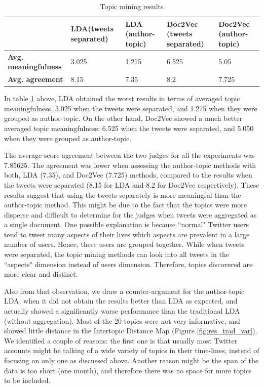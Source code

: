\documentclass[11pt]{article}
\begin{document}
\begin{table}[H]
	\centering
	\begin{tabular}{| l | p{2.5cm} | p{2.5cm} | p{2.5cm} | p{2.5cm} |}
		\hline
		& \textbf{LDA\newline (tweets separated)} & \textbf{LDA (author-topic)} & \textbf{Doc2Vec (tweets separated)} & \textbf{Doc2Vec (author-topic)}\\
		\hline
		\textbf{Avg. meaningfulness} & 3.025 & 1.275 & \cellcolor{blue!25}6.525 & 5.05\\
		\textbf{Avg. agreement} & 8.15 & 7.35 & \cellcolor{blue!25}8.2 & 7.725\\
		\hline
	\end{tabular}
	\caption{Topic mining results}
	\label{tb:res_meaningfulness}
\end{table}

In table \ref{tb:res_meaningfulness} above, LDA obtained the worst results in terms of averaged topic meaningfulness, 3.025 when the tweets were separated, and 1.275 when they were grouped as author-topic. On the other hand, Doc2Vec showed a much better averaged topic meaningfulness: 6.525 when the tweets were separated, and 5.050 when they were grouped as author-topic. 

The average score agreement between the two judges for all the experiments was 7.85625. The agreement was lower when assessing the author-topic methods with both, LDA (7.35), and Doc2Vec (7.725) methods, compared to the results when the tweets were separated (8.15 for LDA and 8.2 for Doc2Vec respectively). These results suggest that using the tweets separately is more meaningful than the author-topic method. This might be due to the fact that the topics were more disperse and difficult to determine for the judges when tweets were aggregated as a single document. One possible explanation is because ``normal" Twitter users tend to tweet many aspects of their lives which aspects are prevalent in a large number of users. Hence, these users are grouped together. While when tweets were separated, the topic mining methods can look into all tweets in the ``aspects" dimension instead of users dimension. Therefore, topics discovered are more clear and distinct.

Also from that observation, we draw a counter-argument for the author-topic LDA, when it did not obtain the results better than LDA as expected, and actually showed a significantly worse performance than the traditional LDA (without aggregation). Most of the 20 topics were not very informative, and showed little distance in the Intertopic Distance Map (Figure \ref{fig:res_trad_var}). We identified a couple of reasons: the first one is that usually most Twitter accounts might be talking of a wide variety of topics in their time-lines, instead of focusing on only one as discussed above. Another reason might be the span of the data is too short (one month), and therefore there was no space for more topics to be included.
\end{document}
